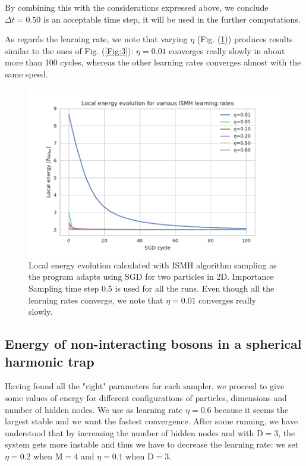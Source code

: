 By combining this with the considerations expressed above, we conclude $\Delta t= 0.50$ is an acceptable time step, it will be used in the further computations. 

As regards the learning rate, we note that varying $\eta$ (Fig. (\ref{Fig:6})) produces results similar to the ones of Fig. (\ref{Fig:3}): $\eta=0.01$ converges really slowly in about more than 100 cycles, whereas the other learning rates converges almost with the same speed.



\begin{figure}[H]
\centering
\includegraphics[scale=1.0]{plot6.pdf}
\caption{Local energy evolution calculated with ISMH algorithm sampling as the program adapts using SGD for two particles in 2D. Importance Sampling time step 0.5 is used for all the runs. Even though all the learning rates converge, we note that $\eta=0.01$ converges really slowly.}
\label{Fig:6}
\end{figure} 


\subsection{Energy of non-interacting bosons in a spherical harmonic trap}
Having found all the "right" parameters for each sampler, we proceed to give some values of energy for different configurations of particles, dimensions and number of hidden nodes. We use as learning rate $\eta=0.6$ because it seems the largest stable and we want the fastest convergence. After some running, we have understood that by increasing the number of hidden nodes and with D$=3$, the system gets more instable and thus we have to decrease the learning rate: we set $\eta=0.2$ when M$=4$ and $\eta=0.1$  when D$=3$.

